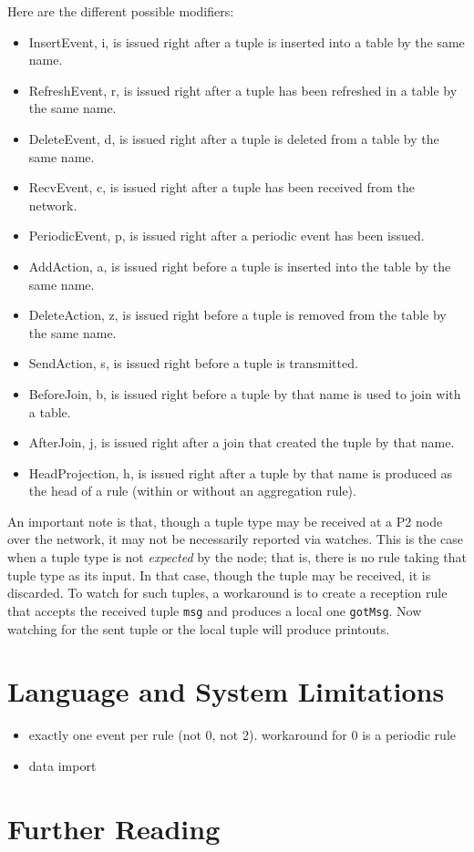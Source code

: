 \documentclass{article}
\begin{document}
Here are the different possible modifiers:
\begin{itemize}
\item InsertEvent, i, is issued right after a tuple is inserted into
  a table by the same name.
\item RefreshEvent, r, is issued right after a tuple has been refreshed
  in a table by the same name.
\item DeleteEvent, d, is issued right after a tuple is deleted from a
  table by the same name.
\item RecvEvent, c, is issued right after a tuple has been received from
  the network.
\item PeriodicEvent, p, is issued right after a periodic event has been issued.
\item AddAction, a, is issued right before a tuple is inserted into the
  table by the same name.
\item DeleteAction, z, is issued right before a tuple is removed from
  the table by the same name.
\item SendAction, s, is issued right before a tuple is transmitted.
\item BeforeJoin, b, is issued right before a tuple by that name is used
  to join with a table.
\item AfterJoin, j, is issued right after a join that created the tuple
  by that name.
\item HeadProjection, h, is issued right after a tuple by that name is
  produced as the head of a rule (within or without an aggregation rule).
\end{itemize}

An important note is that, though a tuple type may be received at a P2
node over the network, it may not be necessarily reported via
watches. This is the case when a tuple type is not \emph{expected} by
the node; that is, there is no rule taking that tuple type as its
input.  In that case, though the tuple may be received, it is
discarded.  To watch for such tuples, a workaround is to create a
reception rule that accepts the received tuple \lstinline$msg$ and produces a local
one \lstinline$gotMsg$.  Now watching for the sent tuple or the local
tuple will produce printouts.


\section{Language and System Limitations}
\begin{itemize}
\item exactly one event per rule (not 0, not 2).  workaround for 0 is
      a periodic rule
\item data import
\end{itemize}
\section{Further Reading}
\end{document}
